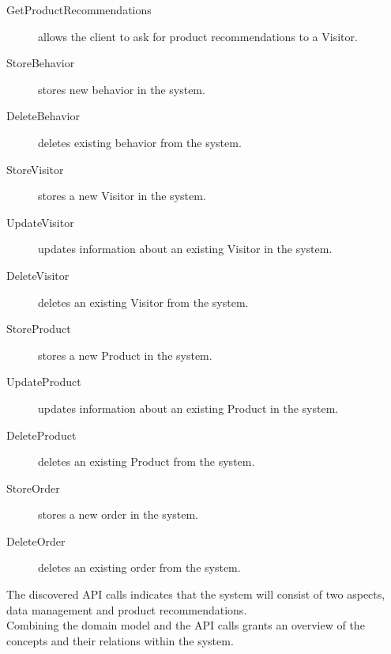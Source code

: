 \begin{description}
	\item[GetProductRecommendations] allows the client to ask for product recommendations to a Visitor.
	\item[StoreBehavior] stores new behavior in the system.
	\item[DeleteBehavior] deletes existing behavior from the system.
	\item[StoreVisitor] stores a new Visitor in the system.
	\item[UpdateVisitor] updates information about an existing Visitor in the system.
	\item[DeleteVisitor] deletes an existing Visitor from the system.
	\item[StoreProduct] stores a new Product in the system.
	\item[UpdateProduct] updates information about an existing Product in the system.
	\item[DeleteProduct] deletes an existing Product from the system.
	\item[StoreOrder] stores a new order in the system.
	\item[DeleteOrder] deletes an existing order from the system.
\end{description}

The discovered API calls indicates that the system will consist of two aspects, data management and product recommendations.\\
Combining the domain model and the API calls grants an overview of the concepts and their relations within the system. 